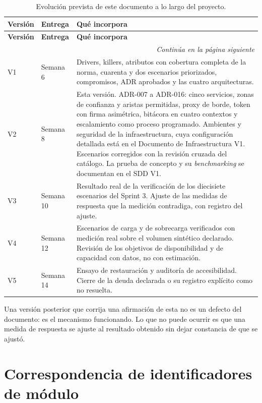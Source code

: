 \documentclass[11pt,a4paper]{article}
\newcommand{\contlinea}[1]{\multicolumn{#1}{r}{\footnotesize\itshape Continúa en la página siguiente}}
\begin{document}
\begin{longtable}{L{1.6cm} L{2.2cm} L{10.6cm}}
\caption{Evolución prevista de este documento a lo largo del proyecto.}\label{tab:evolucion}\\
\toprule
\textbf{Versión} & \textbf{Entrega} & \textbf{Qué incorpora} \\
\midrule
\endfirsthead
\toprule
\textbf{Versión} & \textbf{Entrega} & \textbf{Qué incorpora} \\
\midrule
\endhead
\midrule
\contlinea{3} \\
\endfoot
\bottomrule
\endlastfoot
V1 & Semana 6 & Drivers, killers, atributos con cobertura completa de la norma, cuarenta y dos escenarios priorizados, compromisos, ADR aprobados y las cuatro arquitecturas. \\
V2 & Semana 8 & Esta versión. ADR-007 a ADR-016: cinco servicios, zonas de confianza y aristas permitidas, proxy de borde, token con firma asimétrica, bitácora en cuatro contextos y escalamiento como proceso programado. Ambientes y seguridad de la infraestructura, cuya configuración detallada está en el Documento de Infraestructura V1. Escenarios corregidos con la revisión cruzada del catálogo. La prueba de concepto y su \emph{benchmarking} se documentan en el SDD V1. \\
V3 & Semana 10 & Resultado real de la verificación de los diecisiete escenarios del Sprint 3. Ajuste de las medidas de respuesta que la medición contradiga, con registro del ajuste. \\
V4 & Semana 12 & Escenarios de carga y de sobrecarga verificados con medición real sobre el volumen sintético declarado. Revisión de los objetivos de disponibilidad y de capacidad con datos, no con estimación. \\
V5 & Semana 14 & Ensayo de restauración y auditoría de accesibilidad. Cierre de la deuda declarada o su registro explícito como no resuelta. \\
\end{longtable}

\noindent Una versión posterior que corrija una afirmación de esta no es un defecto del documento: es el mecanismo funcionando. Lo que no puede ocurrir es que una medida de respuesta se ajuste al resultado obtenido sin dejar constancia de que se ajustó.

\appendix

\section{Correspondencia de identificadores de módulo}
\label{sec:anexoA}
\end{document}
